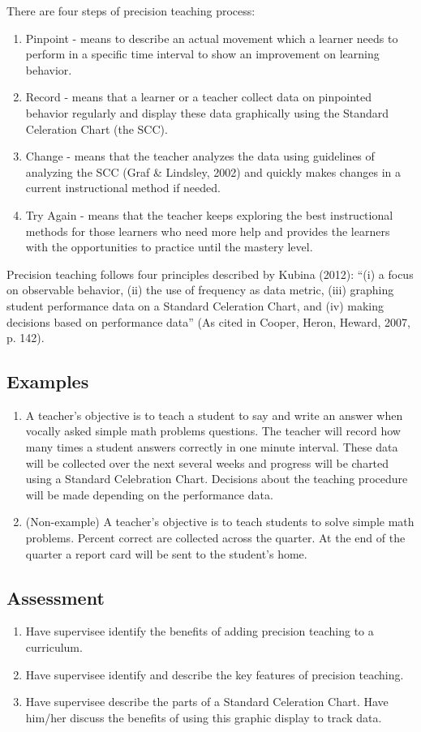 There are four steps of precision teaching process: 
\begin{enumerate}
\item Pinpoint - means to describe an actual movement which a learner needs to perform in a specific time interval to show an improvement on learning behavior.
\item Record - means that a learner or a teacher collect data on pinpointed behavior regularly and display these data graphically using the Standard Celeration Chart (the SCC). 
\item Change - means that the teacher analyzes the data using guidelines of analyzing the SCC (Graf \& Lindsley, 2002) and quickly makes changes in a current instructional method if needed. 
\item Try Again - means that the teacher keeps exploring the best instructional methods for those learners who need more help and provides the learners with the opportunities to practice until the mastery level. 
\end{enumerate}

Precision teaching follows four principles described by Kubina (2012): ``(i) a focus on observable behavior, (ii) the use of frequency as data metric, (iii) graphing student performance data on a Standard Celeration Chart, and (iv) making decisions based on performance data'' (As cited in Cooper, Heron, Heward, 2007, p. 142).
%
\subsection{Examples}
\begin{enumerate}
\item A teacher's objective is to teach a student to say and write an answer when vocally asked simple math problems questions. The teacher will record how many times a student answers correctly in one minute interval. These data will be collected over the next several weeks and progress will be charted using a Standard Celebration Chart. Decisions about the teaching procedure will be made depending on the performance data.
\item (Non-example) A teacher's objective is to teach students to solve simple math problems.  Percent correct are collected across the quarter. At the end of the quarter a report card will be sent to the student's home.
\end{enumerate}
%
\subsection{Assessment}
\begin{enumerate}
\item Have supervisee identify the benefits of adding precision teaching to a curriculum.
\item Have supervisee identify and describe the key features of precision teaching. 
\item Have supervisee describe the parts of a Standard Celeration Chart. Have him/her discuss the benefits of using this graphic display to track data.
\end{enumerate}
%
